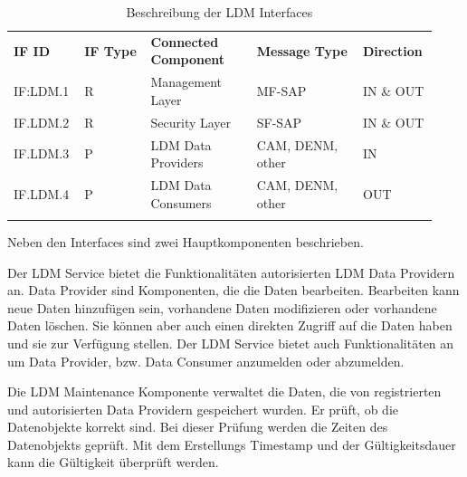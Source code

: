  \begin{longtable}{| p{0.15\linewidth} | p{0.15\linewidth} | p{0.24\linewidth} |p{0.24\linewidth}| p{0.15\linewidth}|}
 \hline
 \textbf{IF ID} & \textbf{IF Type} & \textbf{Connected Component} &  \textbf{Message Type}&\textbf{Direction} \\
IF:LDM.1 & R & Management Layer & MF-SAP & IN \& OUT \\
\hline
IF.LDM.2 & R & Security Layer & SF-SAP & IN \& OUT \\
\hline
IF.LDM.3 & P & LDM Data Providers & CAM, DENM, other & IN \\
\hline
IF.LDM.4 & P & LDM Data Consumers & CAM, DENM, other & OUT \\
\hline 
\caption{Beschreibung der LDM Interfaces \cite{en302895}}
\label{tab:facilityLayer_Beschreibung_Interfaces}
\end{longtable}

Neben den Interfaces sind zwei Hauptkomponenten beschrieben. 

Der \ac{LDM} Service bietet die Funktionalitäten autorisierten \ac{LDM} Data Providern an. Data Provider sind Komponenten, die die Daten bearbeiten. Bearbeiten kann neue Daten hinzufügen sein, vorhandene Daten modifizieren oder vorhandene Daten löschen. Sie können aber auch einen direkten Zugriff auf die Daten haben und sie zur Verfügung stellen. Der \ac{LDM} Service bietet auch Funktionalitäten an um Data Provider, bzw. Data Consumer anzumelden oder abzumelden. 

Die \ac{LDM} Maintenance Komponente verwaltet die Daten, die von registrierten und autorisierten Data Providern gespeichert wurden. Er prüft, ob die Datenobjekte korrekt sind. Bei dieser Prüfung werden die Zeiten des Datenobjekts geprüft. Mit dem Erstellungs Timestamp und der Gültigkeitsdauer  kann die Gültigkeit überprüft werden. 

